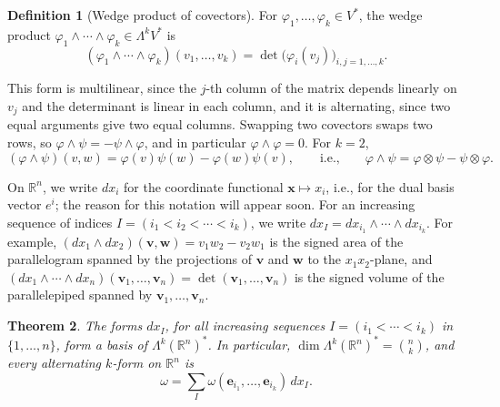 \documentclass[11pt]{article}
\theoremstyle{definition}
\newtheorem{definition}{Definition}[section]
\theoremstyle{plain}
\newtheorem{theorem}[definition]{Theorem}
\theoremstyle{remark}
\begin{document}
\begin{definition}[Wedge product of covectors]\label{def:wedge}
    For $\varphi_1, \ldots, \varphi_k \in V^*$, the wedge product $\varphi_1 \wedge \cdots \wedge \varphi_k \in \Lambda^k V^*$ is
    \[(\varphi_1 \wedge \cdots \wedge \varphi_k)(v_1, \ldots, v_k) = \det\big(\varphi_i(v_j)\big)_{i,j = 1, \ldots, k}.\]
\end{definition}

This form is multilinear, since the $j$-th column of the matrix depends linearly on $v_j$ and the determinant is linear in each column, and it is alternating, since two equal arguments give two equal columns. Swapping two covectors swaps two rows, so $\varphi \wedge \psi = -\psi \wedge \varphi$, and in particular $\varphi \wedge \varphi = 0$. For $k = 2$,
\[(\varphi \wedge \psi)(v, w) = \varphi(v)\psi(w) - \varphi(w)\psi(v), \qquad \text{i.e.,} \qquad \varphi \wedge \psi = \varphi \otimes \psi - \psi \otimes \varphi.\]

On $\mathbb{R}^n$, we write $dx_i$ for the coordinate functional $\mathbf{x} \mapsto x_i$, i.e., for the dual basis vector $e^i$; the reason for this notation will appear soon. For an increasing sequence of indices $I = (i_1 < i_2 < \cdots < i_k)$, we write $dx_I = dx_{i_1} \wedge \cdots \wedge dx_{i_k}$. For example, $(dx_1 \wedge dx_2)(\mathbf{v}, \mathbf{w}) = v_1w_2 - v_2w_1$ is the signed area of the parallelogram spanned by the projections of $\mathbf{v}$ and $\mathbf{w}$ to the $x_1x_2$-plane, and $(dx_1 \wedge \cdots \wedge dx_n)(\mathbf{v}_1, \ldots, \mathbf{v}_n) = \det(\mathbf{v}_1, \ldots, \mathbf{v}_n)$ is the signed volume of the parallelepiped spanned by $\mathbf{v}_1, \ldots, \mathbf{v}_n$.

\begin{theorem}\label{thm:wedge-basis}
    The forms $dx_I$, for all increasing sequences $I = (i_1 < \cdots < i_k)$ in $\{1, \ldots, n\}$, form a basis of $\Lambda^k(\mathbb{R}^n)^*$. In particular, $\dim \Lambda^k(\mathbb{R}^n)^* = \binom{n}{k}$, and every alternating $k$-form on $\mathbb{R}^n$ is
    \[\omega = \sum_I \omega(\mathbf{e}_{i_1}, \ldots, \mathbf{e}_{i_k})\, dx_I.\]
\end{theorem}
\end{document}
